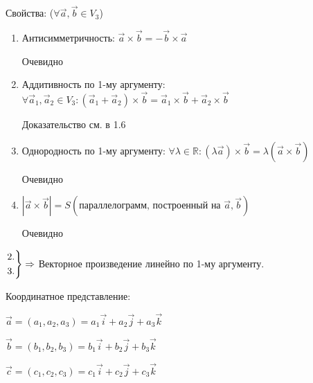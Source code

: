 Свойства: (\(\forall \vec a, \vec b \in V_3\))
\begin{enumerate}
    \item Антисимметричность: \(\vec a \times \vec b = -\vec b \times \vec a\)

          Очевидно
    \item Аддитивность по 1-му аргументу: \(\forall \vec a_1, \vec a_2 \in V_3:
          (\vec a_1 + \vec a_2) \times \vec b = \vec a_1 \times \vec b + \vec a_2 \times \vec b\)

          Доказательство см. в 1.6
    \item Однородность по 1-му аргументу: \(\forall \lambda \in \mathbb{R}: (\lambda \vec a)\times \vec b = \lambda(\vec a \times \vec b)\)

          Очевидно
    \item \(|\vec a \times \vec b| = S(\text{параллелограмм, построенный на } \vec a, \vec b)\)

          Очевидно
\end{enumerate}

\(\begin{rcases*}
    2. \\
    3.
\end{rcases*} \Rightarrow\) Векторное произведение линейно по 1-му аргументу.

Координатное представление:

\(\vec a = (a_1, a_2, a_3) = a_1\vec i + a_2\vec j + a_3\vec k\)

\(\vec b = (b_1, b_2, b_3) = b_1\vec i + b_2\vec j + b_3\vec k\)

\(\vec c = (c_1, c_2, c_3) = c_1\vec i + c_2\vec j + c_3\vec k\)

